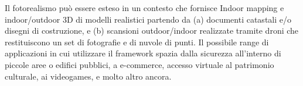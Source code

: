 Il fotorealismo può essere esteso in un contesto che fornisce Indoor mapping e indoor/outdoor 3D di modelli realistici
partendo da (a) documenti catastali e/o disegni di costruzione, e (b) scansioni outdoor/indoor realizzate tramite droni
che restituiscono un set di fotografie e di nuvole di punti.
Il possibile range di applicazioni in cui utilizzare il framework spazia dalla sicurezza all'interno di piccole aree o edifici pubblici, a e-commerce,
accesso virtuale al patrimonio culturale, ai videogames, e molto altro ancora.




\newpage
